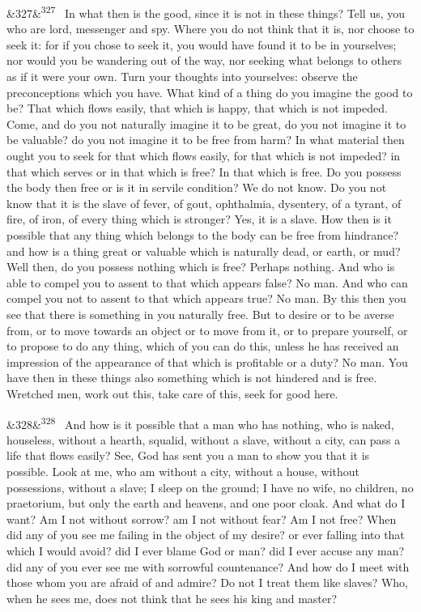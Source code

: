 \documentclass[12pt]{article}
\newcommand{\para}[1][]{\par\noindent\ifx&#1&\else\textsuperscript{\footnotesize #1}~\fi}
\begin{document}
\para[327] In what then is the good, since it is not in these things? Tell us, you who are lord, messenger and spy. Where you do not think that it is, nor choose to seek it: for if you chose to seek it, you would have found it to be in yourselves; nor would you be wandering out of the way, nor seeking what belongs to others as if it were your own. Turn your thoughts into yourselves: observe the preconceptions which you have. What kind of a thing do you imagine the good to be? That which flows easily, that which is happy, that which is not impeded. Come, and do you not naturally imagine it to be great, do you not imagine it to be valuable? do you not imagine it to be free from harm? In what material then ought you to seek for that which flows easily, for that which is not impeded? in that which serves or in that which is free? In that which is free. Do you possess the body then free or is it in servile condition? We do not know. Do you not know that it is the slave of fever, of gout, ophthalmia, dysentery, of a tyrant, of fire, of iron, of every thing which is stronger? Yes, it is a slave. How then is it possible that any thing which belongs to the body can be free from hindrance? and how is a thing great or valuable which is naturally dead, or earth, or mud? Well then, do you possess nothing which is free? Perhaps nothing. And who is able to compel you to assent to that which appears false? No man. And who can compel you not to assent to that which appears true? No man. By this then you see that there is something in you naturally free. But to desire or to be averse from, or to move towards an object or to move from it, or to prepare yourself, or to propose to do any thing, which of you can do this, unless he has received an impression of the appearance of that which is profitable or a duty? No man. You have then in these things also something which is not hindered and is free. Wretched men, work out this, take care of this, seek for good here.

\para[328] And how is it possible that a man who has nothing, who is naked, houseless, without a hearth, squalid, without a slave, without a city, can pass a life that flows easily? See, God has sent you a man to show you that it is possible. Look at me, who am without a city, without a house, without possessions, without a slave; I sleep on the ground; I have no wife, no children, no praetorium, but only the earth and heavens, and one poor cloak. And what do I want? Am I not without sorrow? am I not without fear? Am I not free? When did any of you see me failing in the object of my desire? or ever falling into that which I would avoid? did I ever blame God or man? did I ever accuse any man? did any of you ever see me with sorrowful countenance? And how do I meet with those whom you are afraid of and admire? Do not I treat them like slaves? Who, when he sees me, does not think that he sees his king and master?
\end{document}

